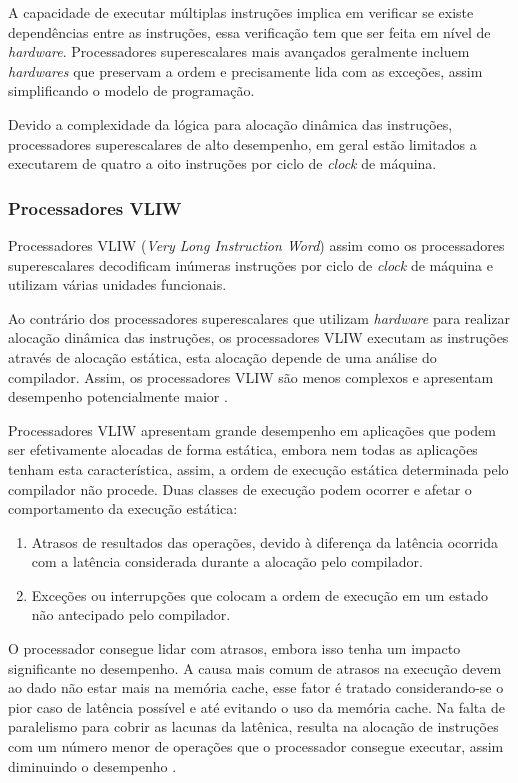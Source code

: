 A capacidade de executar múltiplas instruções implica em verificar se existe
dependências entre as instruções, essa verificação tem que ser feita em nível de
\textit{hardware}. 
Processadores superescalares mais avançados geralmente incluem 
\textit{hardwares} que preservam a ordem e precisamente lida com as exceções, 
assim simplificando o modelo de programação.

Devido a complexidade da lógica para alocação dinâmica das instruções,
processadores superescalares de alto desempenho, em geral estão limitados a
executarem de quatro a oito instruções por ciclo de \textit{clock} de máquina.


\subsubsection{Processadores VLIW}

Processadores VLIW (\textit{Very Long Instruction Word}) assim como os
processadores superescalares decodificam inúmeras instruções por ciclo de
\textit{clock} de máquina e utilizam várias unidades funcionais.

Ao contrário dos processadores superescalares que utilizam \textit{hardware}
para realizar alocação dinâmica das instruções, os processadores VLIW executam as 
instruções através de alocação estática, esta alocação depende de uma análise do
compilador.
Assim, os processadores VLIW são menos complexos e apresentam desempenho 
potencialmente maior \cite{eopc}.

Processadores VLIW apresentam grande desempenho em aplicações que podem ser 
efetivamente alocadas de forma estática, embora nem todas as aplicações
tenham esta característica, assim, a ordem de execução estática determinada pelo
compilador não procede. 
Duas classes de execução podem ocorrer e afetar o comportamento da execução 
estática:

\begin{enumerate}
        \item Atrasos de resultados das operações, devido à diferença da latência
                ocorrida com a latência considerada durante a alocação pelo
                compilador.
        \item Exceções ou interrupções que colocam a ordem de execução em um
                estado não antecipado pelo compilador.
\end{enumerate}

O processador consegue lidar com atrasos, embora isso tenha um impacto 
significante no desempenho. 
A causa mais comum de atrasos na execução devem ao dado não estar mais na 
memória cache, esse fator é tratado considerando-se o pior caso de latência 
possível e até evitando o uso da memória cache. 
Na falta de paralelismo para cobrir as lacunas da latênica, resulta na 
alocação de instruções com um número menor de operações que o processador 
consegue executar, assim diminuindo o desempenho \cite{ocfma}.


